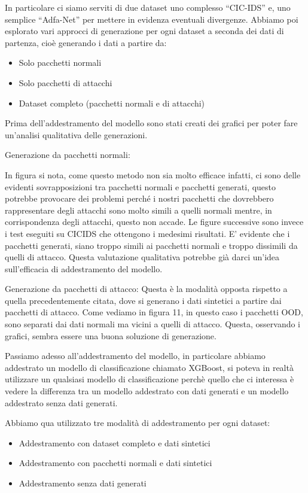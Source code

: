 \documentclass[11pt]{article}
\begin{document}
In particolare ci siamo serviti di due dataset uno complesso ``CIC-IDS'' e, uno semplice ``Adfa-Net'' per mettere in evidenza eventuali divergenze.
Abbiamo poi esplorato vari approcci di generazione per ogni dataset a seconda dei dati di partenza, cioè generando i dati a partire da:

\begin{itemize}
  \item Solo pacchetti normali
  \item Solo pacchetti di attacchi
  \item Dataset completo (pacchetti normali e di attacchi)
\end{itemize}

Prima dell'addestramento del modello sono stati creati dei grafici per poter fare un'analisi qualitativa delle generazioni.

Generazione da pacchetti normali:

In figura si nota, come questo metodo non sia molto efficace infatti, ci sono delle evidenti sovrapposizioni tra pacchetti normali e pacchetti generati, questo potrebbe provocare dei problemi perché i nostri pacchetti che dovrebbero rappresentare degli attacchi sono molto simili a quelli normali mentre, in corrispondenza degli attacchi, questo non accade. Le figure successive sono invece i test eseguiti su CICIDS che ottengono i medesimi risultati.
E’ evidente che i pacchetti generati, siano troppo simili ai pacchetti normali e troppo dissimili da quelli di attacco. Questa valutazione qualitativa potrebbe già darci un’idea sull’efficacia di addestramento del modello.

Generazione da pacchetti di attacco:
Questa è la modalità opposta rispetto a quella precedentemente citata, dove si generano i dati sintetici a partire dai pacchetti di attacco. Come vediamo in figura 11, in questo caso i pacchetti OOD, sono separati dai dati normali ma vicini a quelli di attacco. Questa, osservando i grafici, sembra essere una buona soluzione di generazione.

Passiamo adesso all'addestramento del modello, in particolare abbiamo addestrato un modello di classificazione chiamato XGBoost, si poteva in realtà utilizzare un qualsiasi modello di classificazione perchè quello che ci interessa è vedere la differenza tra un modello addestrato con dati generati e un modello addestrato senza dati generati.

Abbiamo qua utilizzato tre modalità di addestramento per ogni dataset:

\begin{itemize}
  \item Addestramento con dataset completo e dati sintetici
  \item Addestramento con pacchetti normali e dati sintetici
  \item Addestramento senza dati generati
\end{itemize}
\end{document}
